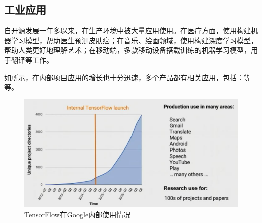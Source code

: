 \subsection{工业应用}

\begin{content}

自开源发展一年多以来，在生产环境中被大量应用使用。在医疗方面，使用构建机器学习模型，帮助医生预测皮肤癌；在音乐、绘画领域，使用构建深度学习模型，帮助人类更好地理解艺术；在移动端，多款移动设备搭载训练的机器学习模型，用于翻译等工作。

如所示，在内部项目应用的增长也十分迅速，多个产品都有相关应用，包括：等等。

\begin{figure}[!htbp]
\centering
\includegraphics[width=1.0\textwidth]{figures/tf-google-apps.png}
\caption{TensorFlow在Google内部使用情况}
 \label{fig:tf-google-apps}
\end{figure}


\end{content}